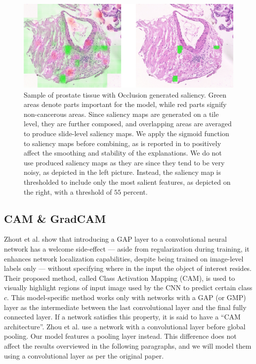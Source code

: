 \begin{figure}[!h]
    \begin{center}
    \begin{minipage}{1\textwidth}
      \includegraphics[width=\textwidth]{img/occlusion.png}
    \end{minipage}
    \caption{Sample of prostate tissue with Occlusion generated saliency. Green areas denote parts important for the model, while red parts signify non-cancerous areas. Since saliency maps are generated on a tile level, they are further composed, and overlapping areas are averaged to produce slide-level saliency maps. We apply the sigmoid function to saliency maps before combining, as is reported in \cite{gallo} to positively affect the smoothing and stability of the explanations. We do not use produced saliency maps as they are since they tend to be very noisy, as depicted in the left picture. Instead, the saliency map is thresholded to include only the most salient features, as depicted on the right, with a threshold of $55$ percent.}
    \label{fig:occ-saliency}
    \end{center}
\end{figure}

\subsection{CAM \& GradCAM}\label{subsec:cam}

Zhout et al. \cite{cam} show that introducing a GAP layer to a convolutional neural network has a welcome side-effect --- aside from regularization during training, it enhances network localization capabilities, despite being trained on image-level labels only --- without specifying where in the input the object of interest resides.
Their proposed method, called Class Activation Mapping (CAM), is used to visually highlight regions of input image used by the CNN to predict certain class $c$.
This model-specific method works only with networks with a GAP (or GMP) layer as the intermediate between the last convolutional layer and the final fully connected layer.
If a network satisfies this property, it is said to have a ``CAM architecture''.
Zhou et al. \cite{cam} use a network with a convolutional layer before global pooling.
Our model features a pooling layer instead.
This difference does not affect the results overviewed in the following paragraphs, and we will model them using a convolutional layer as per the original paper. 

